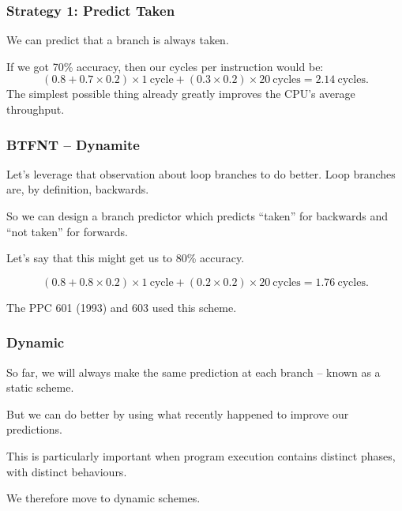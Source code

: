\begin{frame}
\frametitle{Strategy 1: Predict Taken}

We can predict that a branch is always taken. 

If we got 70\% accuracy, then our cycles per instruction would be:
\[
(0.8 + 0.7 \times 0.2) \times 1 \mathrm{~cycle} + (0.3 \times 0.2) \times 20 \mathrm{~cycles} = 2.14 \mathrm{~cycles}.
\]
The simplest possible thing already greatly improves the CPU's average throughput.

\end{frame}



\begin{frame}
\frametitle{BTFNT -- Dynamite}

Let's leverage that observation about loop branches to do better.
Loop branches are, by definition, backwards. 

So we can design a branch predictor which predicts ``taken''
for backwards and ``not taken'' for forwards. 

Let's say that this might get us to 80\% accuracy. 

\[
(0.8 + 0.8 \times 0.2) \times 1 \mathrm{~cycle} + (0.2 \times 0.2) \times 20 \mathrm{~cycles} = 1.76 \mathrm{~cycles}.
\]

The PPC 601 (1993) and 603 used this scheme.

\end{frame}


\begin{frame}
\frametitle{Dynamic}

So far, we will always make the same prediction at each branch -- known as a
\alert{static} scheme. 

But we can do better by using what recently happened to
improve our predictions. 

This is particularly important when program execution
contains distinct phases, with distinct behaviours.


We therefore move to \alert{dynamic} schemes.

\end{frame}



